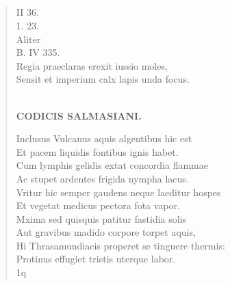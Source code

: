 \documentclass[11pt, a4paper]{report}
\begin{document}
            \subsection*{}
      \begin{verse}
      II 36. \\ 1. 23. \\ Aliter \\ B. IV 335. \\ Regia praeclaras erexit iussio moles, \\ Sensit et imperium calx lapis unda focus. \\ 
        ﻿\pagebreak 
    \begin{center} \textbf{CODICIS SALMASIANI.} \end{center} \marginpar{[181]} Inclusus Vulcanus aquis algentibus hic est \\ Et pacem liquidis fontibus ignis habet. \\ Cum lymphis gelidis extat concordia flammae \\ Ac stupet ardentes frigida nympha lacus. \\ Vritur hic semper gaudens neque laeditur hospes \\ Et vegetat medicus pectora fota vapor. \\ Mxima sed quisquis patitur fastidia solis \\ Aut gravibus madido corpore torpet aquis, \\ Hi Thrasamundiacis properet se tinguere thermis: \\ Protinus effugiet tristis uterque labor. \\ 1q \\ 
      \end{verse}
  
\end{document}
